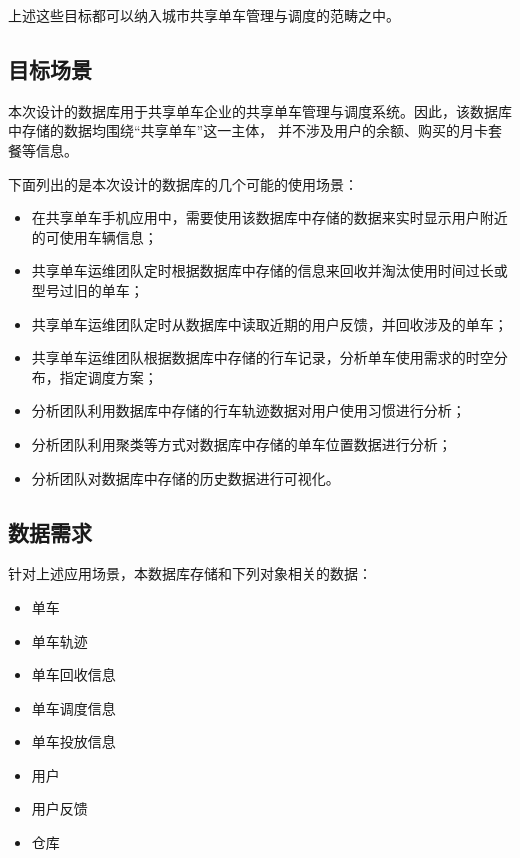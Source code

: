 上述这些目标都可以纳入城市共享单车管理与调度的范畴之中。
\subsection{目标场景}
本次设计的数据库用于共享单车企业的共享单车管理与调度系统。因此，该数据库中存储的数据均围绕“共享单车”这一主体，
并不涉及用户的余额、购买的月卡套餐等信息。

下面列出的是本次设计的数据库的几个可能的使用场景：
\begin{itemize}
    \item 在共享单车手机应用中，需要使用该数据库中存储的数据来实时显示用户附近的可使用车辆信息；
    \item 共享单车运维团队定时根据数据库中存储的信息来回收并淘汰使用时间过长或型号过旧的单车；
    \item 共享单车运维团队定时从数据库中读取近期的用户反馈，并回收涉及的单车；
    \item 共享单车运维团队根据数据库中存储的行车记录，分析单车使用需求的时空分布，指定调度方案；
    \item 分析团队利用数据库中存储的行车轨迹数据对用户使用习惯进行分析；
    \item 分析团队利用聚类等方式对数据库中存储的单车位置数据进行分析；
    \item 分析团队对数据库中存储的历史数据进行可视化。
\end{itemize}
\subsection{数据需求}
针对上述应用场景，本数据库存储和下列对象相关的数据：
\begin{itemize}
    \item 单车
    \item 单车轨迹
    \item 单车回收信息
    \item 单车调度信息
    \item 单车投放信息
    \item 用户
    \item 用户反馈
    \item 仓库
\end{itemize}
